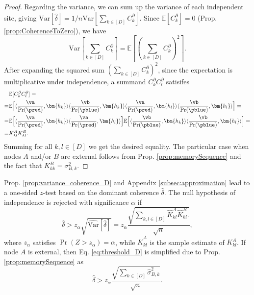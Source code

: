 \begin{appendices}
\begin{proof}
 Regarding the variance, we can sum up the variance of each independent site, giving $\mathrm{Var}[\hat{\delta}] = 1/n  \mathrm{Var}[\sum_{k \in [D]}C^\partial_k] $. Since $\mathbb{E}[C^\partial_k] = 0$ (Prop. \ref{prop:CoherenceToZero}), we have 
 \begin{equation} \label{eq:VarianceExpected}
     \mathrm{Var}[\sum_{k \in [D]}C^\partial_k] =\mathbb{E}[(\sum_{k \in [D]}C^\partial_k)^2 ].
 \end{equation}
 After expanding the squared sum $(\sum_{k \in [D]}C^\partial_k)^2$, since the expectation is multiplicative under independence, a summand 
 $C^\partial_k C^\partial_l$ satisifes
  \begin{align}
 &\mathbb{E}[C^\partial_k C^\partial_l] = \\
 =& \mathbb{E}\Big[\langle \frac{\va}{\Pr(\pred)},\bm{h_k}\rangle \langle \frac{\vb}{\Pr(\pblue)}, \bm{h_k} \rangle \langle \frac{\va}{\Pr(\pred)},\bm{h_l}\rangle \langle \frac{\vb}{\Pr(\pblue)}, \bm{h_l} \rangle\Big]= \nonumber\\
  =& \mathbb{E}\Big[\langle \frac{\va}{\Pr(\pred)},\bm{h_k}\rangle \langle \frac{\va}{\Pr(\pred)},\bm{h_l}\rangle \Big]  \mathbb{E}\Big[\langle \frac{\vb}{\Pr(\pblue)}, \bm{h_k} \rangle \langle \frac{\vb}{\Pr(\pblue)}, \bm{h_l} \rangle\Big]= \nonumber\\
  =& K^A_{kl}   K^B_{kl}.\nonumber
 \end{align}
 Summing for all $k,l \in [D]$ we get the desired equality.  The particular case when nodes $A$ and/or $B$ are external follows from Prop. \ref{prop:memorySequence} and the fact that $K^B_{kk} = \sigma^2_{B,k} $.
 
\end{proof}


Prop. \ref{prop:variance_coherence_D} and Appendix \ref{subsec:approximation} lead to a one-sided $z$-test based on the dominant coherence $\hat{\delta}$. The null hypothesis of independence is rejected with significance $\alpha$ if 
\begin{equation} \label{eq:threshold_D}
     \hat{\delta} >  z_\alpha \sqrt{
     {\mathrm{\widehat{Var}}}[\hat{\delta}]
     } = z_\alpha \frac{\sqrt{\sum_{k, l \in [D]} 
   \hat{K}^A_{kl}   \hat{K}^B_{kl}.
}}{\sqrt{n}},
\end{equation} where $z_\alpha$ satisfies $\Pr(Z > z_\alpha) = \alpha$, while $\hat{K}^A_{kl}$ is the sample estimate of $K^A_{kl}$. If node $A$ is external, then Eq. \ref{eq:threshold_D} is simplified due to Prop. \ref{prop:memorySequence} as 
\begin{equation} \label{eq:threshold_D_external}
     \hat{\delta} > z_\alpha \frac{\sqrt{\sum_{k\in [D]}  \hat{\sigma}^2_{B,k}
}}{\sqrt{n}}.
\end{equation}
\bigskip



\end{appendices}
